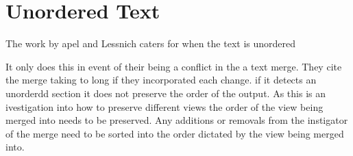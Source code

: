 
\chapter{Unordered Text}

The work by apel and Lessnich caters for when the text is unordered

It only does this in event of their being a conflict in the a text merge.   They cite the merge taking to long if they incorporated each change.
if it detects an unorderdd section it does not preserve the order of the output.  As this is an ivestigation into how to preserve different views the order of the view being merged into needs to be preserved.  Any additions or removals from the instigator of the merge need to be sorted into the order dictated by the view being merged into.

 
